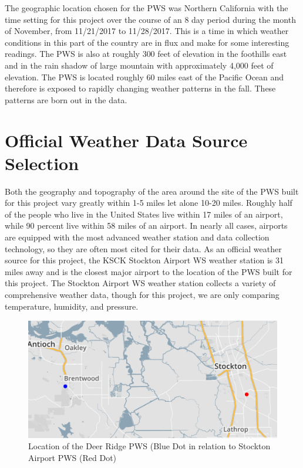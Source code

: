 \documentclass[sigconf]{acmart}
\begin{document}
The geographic location chosen for the PWS was Northern California with the time setting for this project over the course of an 8 day period during the month of November, from 11/21/2017 to 11/28/2017. This is a time in which weather conditions in this part of the country are in flux and make for some interesting readings. The PWS is also at roughly 300 feet of elevation in the foothills east and in the rain shadow of large mountain with approximately 4,000 feet of elevation. The PWS is located roughly 60 miles east of the Pacific Ocean and therefore is exposed to rapidly changing weather patterns in the fall. These patterns are born out in the data.

\section{Official Weather Data Source Selection}

Both the geography and topography of the area around the site of the PWS built for this project vary greatly within 1-5 miles let alone 10-20 miles. Roughly half of the people who live in the United States live within 17 miles of an airport, while 90 percent live within 58 miles of an airport.\cite{Pearson2017} In nearly all cases, airports are equipped with the most advanced weather station and data collection technology, so they are often most cited for their data. As an official weather source for this project, the KSCK Stockton Airport WS weather station is 31 miles away and is the closest major airport to the location of the PWS built for this project. The Stockton Airport WS weather station collects a variety of comprehensive weather data, though for this project, we are only comparing temperature, humidity, and pressure. 

\begin{figure}[H]
    \centering
    \includegraphics[width=\columnwidth]{images/DR_Stockton.PNG}
    \caption{Location of the Deer Ridge PWS (Blue Dot in relation to Stockton Airport PWS (Red Dot)}
    \label{Image 1: Deer Ridge}
\end{figure}
\end{document}
